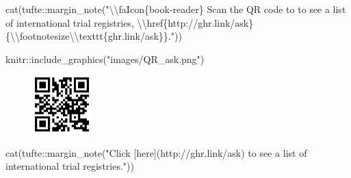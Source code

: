 \documentclass[
  letterpaper,
  DIV=11,
  numbers=noendperiod,
  oneside]{scrartcl}
\newenvironment{Shaded}{\begin{snugshade}}{\end{snugshade}}
\newcommand{\FunctionTok}[1]{\textcolor[rgb]{0.28,0.35,0.67}{#1}}
\newcommand{\NormalTok}[1]{\textcolor[rgb]{0.00,0.23,0.31}{#1}}
\newcommand{\SpecialCharTok}[1]{\textcolor[rgb]{0.37,0.37,0.37}{#1}}
\newcommand{\StringTok}[1]{\textcolor[rgb]{0.13,0.47,0.30}{#1}}
\begin{document}
\vspace{2em}

\begin{Shaded}
\begin{Highlighting}[]
\FunctionTok{cat}\NormalTok{(tufte}\SpecialCharTok{::}\FunctionTok{margin\_note}\NormalTok{(}\StringTok{"}\SpecialCharTok{\textbackslash{}\textbackslash{}}\StringTok{faIcon\{book{-}reader\} Scan the QR code to to see a list of international trial registries, }\SpecialCharTok{\textbackslash{}\textbackslash{}}\StringTok{href\{http://ghr.link/ask\}\{}\SpecialCharTok{\textbackslash{}\textbackslash{}}\StringTok{footnotesize}\SpecialCharTok{\textbackslash{}\textbackslash{}}\StringTok{texttt\{ghr.link/ask\}\}."}\NormalTok{))}
\end{Highlighting}
\end{Shaded}


\begin{Shaded}
\begin{Highlighting}[]
\NormalTok{knitr}\SpecialCharTok{::}\FunctionTok{include\_graphics}\NormalTok{(}\StringTok{"images/QR\_ask.png"}\NormalTok{)}
\end{Highlighting}
\end{Shaded}

\begin{figure}[H]

{\centering \includegraphics[width=0.2\textwidth,height=\textheight]{images/QR_ask.png}

}

\end{figure}

\begin{Shaded}
\begin{Highlighting}[]
\FunctionTok{cat}\NormalTok{(tufte}\SpecialCharTok{::}\FunctionTok{margin\_note}\NormalTok{(}\StringTok{"Click [here](http://ghr.link/ask) to see a list of international trial registries."}\NormalTok{))}
\end{Highlighting}
\end{Shaded}
\end{document}
